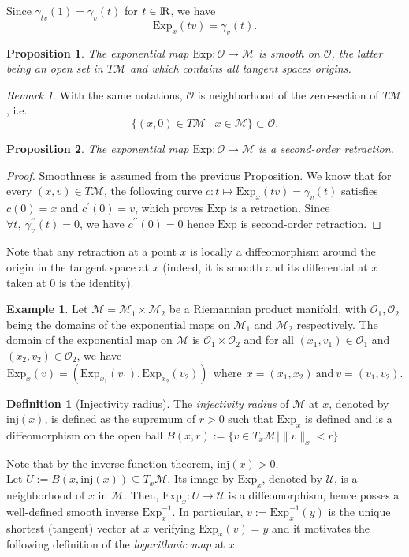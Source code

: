 \documentclass[10pt,a4paper]{book}
\theoremstyle{definition}
\newtheorem{defn}{Definition}[section]
\newtheorem{exm}{Example}[section]
\theoremstyle{plain}
\newtheorem{prop}{Proposition}[section]
\theoremstyle{remark}
\newtheorem{rmk}{Remark}[section]
\newcommand \M {\mathcal{M}}
\def\R{{\rm I\kern-0.16em R}}
\begin{document}
Since $\gamma_{tv}(1)=\gamma_v(t)$ for $t\in \R$, we have
$$\text{Exp}_x(tv)=\gamma_v(t).$$
\begin{prop}
The exponential map $\text{Exp}:\mathcal{O}\to \M$ is smooth on $\mathcal{O}$, the latter being an open set in $T\M$ and which contains all tangent spaces origins.
\end{prop}
\begin{rmk} With the same notations, $\mathcal{O}$ is neighborhood of the zero-section of $T\M$, i.e.
$$\{(x,0)\in T\M\mid x\in \M\}\subset \mathcal{O}.$$
\end{rmk}
\begin{prop}
The exponential map $\text{Exp}: \mathcal{O} \to \M$ is a second-order retraction.
\end{prop}
\begin{proof}
Smoothness is assumed from the previous Proposition. We know that for every $(x,v)\in T\M$, the following curve $c:t\mapsto \text{Exp}_x(tv)=\gamma_v(t)$ satisfies $c(0)=x$ and $c^{\prime}(0)=v$, which proves $\text{Exp}$ is a retraction. Since $\forall t,~\gamma_v^{\prime \prime}(t)=0$, we have $c^{\prime \prime}(0)=0$ hence $\text{Exp}$ is second-order retraction.
\end{proof}
Note that any retraction at a point $x$ is locally a diffeomorphism around the origin in the tangent space at $x$ (indeed, it is smooth and its differential at $x$ taken at $0$ is the identity).
\begin{exm}
Let $\M=\M_1\times \M_2$ be a Riemannian product manifold, with $\mathcal{O}_1, \mathcal{O}_2$ being the domains of the exponential maps on $\M_1$ and $\M_2$ respectively. The domain of the exponential map on $\M$ is $\mathcal{O}_1\times \mathcal{O}_2$ and for all $(x_1,v_1)\in \mathcal{O}_1$ and $(x_2,v_2)\in \mathcal{O}_2$, we have
$$\text{Exp}_x(v)=(\text{Exp}_{x_1}(v_1),\text{Exp}_{x_2}(v_2))~~\text{where}~~x=(x_1,x_2)~\text{and}~v=(v_1,v_2).$$
\end{exm}
\begin{defn}[Injectivity radius]
The \emph{injectivity radius} of $\M$ at $x$, denoted by $\text{inj}(x)$,  is defined as the supremum of $r>0$ such that $\text{Exp}_x$ is defined and is a diffeomorphism on the open ball $B(x,r):=\{v\in T_x\M\mid \|v\|_x<r\}$. 
\end{defn}
Note that by the inverse function theorem, $\text{inj}(x)>0$.\\ Let $U:=B(x,\text{inj}(x))\subseteq T_x\M$. Its image by $\text{Exp}_x$, denoted by $\mathcal{U}$, is a neighborhood of $x$ in $\M$. Then, $\text{Exp}_x:U \to \mathcal{U}$ is a diffeomorphism, hence posses a well-defined smooth inverse $\text{Exp}_x^{-1}$. In particular, $v:=\text{Exp}_x^{-1}(y)$ is the unique shortest (tangent) vector at $x$ verifying $\text{Exp}_x(v)=y$ and it motivates the following definition of the \emph{logarithmic map} at $x$.
\end{document}
